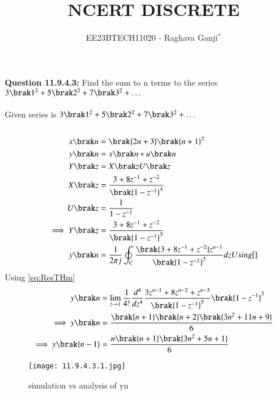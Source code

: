 \documentclass[journal,12pt,twocolumn]{IEEEtran}
\theoremstyle{remark}
\begin{document}

\vspace{3cm}

\title{NCERT DISCRETE}
\author{EE23BTECH11020 - Raghava Ganji$^{*}$%
}
\maketitle
\newpage
\bigskip

\renewcommand{\thefigure}{\theenumi}
\renewcommand{\thetable}{\theenumi}
\textbf{Question 11.9.4.3:}
Find the sum to n terms to the series $3\brak 1^2+5\brak 2^2+7\brak 3^2+ \ldots$\\ 
\solution\\
Given series is $3\brak 1^2+5\brak 2^2+7\brak 3^2+ \ldots$\\\\

\begin{align}
x\brak n&=\brak{2n+3}\brak{n+1}^2\\
y\brak n&=x\brak n*u\brak n\\
Y\brak z&=X\brak zU\brak z\\
X\brak z&=\frac{3+8z^{-1}+z^{-2}}{\brak{1-z^{-1}}^4}\\
U\brak z&=\frac{1}{1-z^{-1}}\\
\implies Y\brak z&=\frac{3+8z^{-1}+z^{-2}}{\brak{1-z^{-1}}^5}\\
y\brak n&=\frac{1}{2\pi j}\oint_C\frac{\brak{3+8z^{-1}+z^{-2}}z^{n-1}}{\brak{1-z^{-1}}^5}dz\nonumber Using\eqref{}  
\end{align} 
Using \eqref{eq:ResTHm}
\begin{align}
y\brak n&=\lim_{z\to 1}\frac{1}{4!}\frac{d^4}{dz^4}\frac{3z^{n-1}+8z^{n-2}+z^{n-3}}{\brak{1-z^{-1}}^5}\brak {1-z^{-1}}^5\\
\implies y\brak n&=\frac{\brak{n+1}\brak{n+2}\brak{3n^2+11n+9}}{6}\\
\implies y\brak {n-1}&=\frac{n\brak{n+1}\brak{3n^2+5n+1}}{6}
\end{align}
\begin{figure}
    \centering
    \texttt{[image: 11.9.4.3.1.jpg]}
    \caption{simulation vs analysis of y\brak n}
\end{figure}
\end{document}
